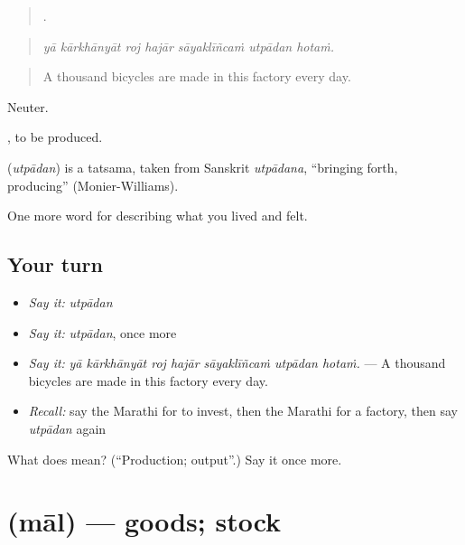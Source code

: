 \begin{quote}
      .
\end{quote}

\begin{quote}
\emph{yā kārkhānyāt roj hajār sāyaklīñcaṁ utpādan hotaṁ.}
\end{quote}

\begin{quote}
A thousand bicycles are made in this factory every day.
\end{quote}

Neuter.

 , to be produced.

\begin{cousinweb}
\textbf{} (\emph{utpādan}) is a tatsama, taken from Sanskrit \emph{utpādana}, \textquotedblleft{}bringing forth, producing\textquotedblright{} (Monier-Williams).
\end{cousinweb}

\begin{grammarlens}[title={What you've built}]
One more word for describing what you lived and felt.
\end{grammarlens}

\subsection*{Your turn}
\begin{itemize}
\raggedright
  \item \emph{Say it:} \emph{utpādan}
  \item \emph{Say it:} \emph{utpādan}, once more
  \item \emph{Say it:} \emph{yā kārkhānyāt roj hajār sāyaklīñcaṁ utpādan hotaṁ.} — A thousand bicycles are made in this factory every day.
  \item \emph{Recall:} say the Marathi for to invest, then the Marathi for a factory, then say \emph{utpādan} again
\end{itemize}

\begin{tcolorbox}[breakable,colback=teal!4,colframe=teal!35!black,title={Before you move on}]
What does  mean? (\textquotedblleft{}Production; output\textquotedblright{}.) Say it once more.
\end{tcolorbox}
\section[\texorpdfstring{\mr{माल} (māl)}{माल (māl)}]{ (māl) — goods; stock}

